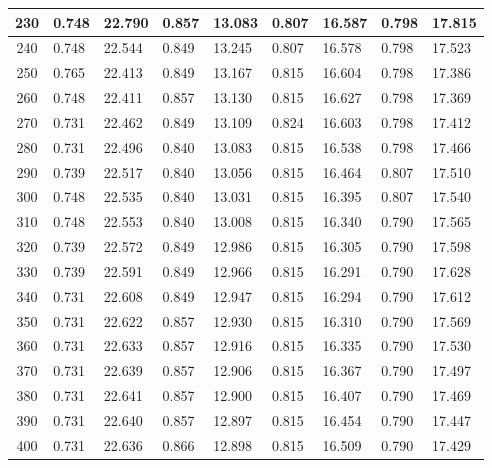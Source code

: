 \documentclass{report}
\begin{document}
\begin{minipage}{\textwidth}
\begin{longtable}{|c|l|l|l|l|l|l|l|l|}
                     230 & 0.748 & 22.790 & 0.857 & 13.083 & 0.807 & 16.587 & 0.798 & 17.815 \\ \hline
                     240 & 0.748 & 22.544 & 0.849 & 13.245 & 0.807 & 16.578 & 0.798 & 17.523 \\ \hline
                     250 & 0.765 & 22.413 & 0.849 & 13.167 & 0.815 & 16.604 & 0.798 & 17.386 \\ \hline
                     260 & 0.748 & 22.411 & 0.857 & 13.130 & 0.815 & 16.627 & 0.798 & 17.369 \\ \hline
                     270 & 0.731 & 22.462 & 0.849 & 13.109 & 0.824 & 16.603 & 0.798 & 17.412 \\ \hline
                     280 & 0.731 & 22.496 & 0.840 & 13.083 & 0.815 & 16.538 & 0.798 & 17.466 \\ \hline
                     290 & 0.739 & 22.517 & 0.840 & 13.056 & 0.815 & 16.464 & 0.807 & 17.510 \\ \hline
                     300 & 0.748 & 22.535 & 0.840 & 13.031 & 0.815 & 16.395 & 0.807 & 17.540 \\ \hline
                     310 & 0.748 & 22.553 & 0.840 & 13.008 & 0.815 & 16.340 & 0.790 & 17.565 \\ \hline
                     320 & 0.739 & 22.572 & 0.849 & 12.986 & 0.815 & 16.305 & 0.790 & 17.598 \\ \hline
                     330 & 0.739 & 22.591 & 0.849 & 12.966 & 0.815 & 16.291 & 0.790 & 17.628 \\ \hline
                     340 & 0.731 & 22.608 & 0.849 & 12.947 & 0.815 & 16.294 & 0.790 & 17.612 \\ \hline
                     350 & 0.731 & 22.622 & 0.857 & 12.930 & 0.815 & 16.310 & 0.790 & 17.569 \\ \hline
                     360 & 0.731 & 22.633 & 0.857 & 12.916 & 0.815 & 16.335 & 0.790 & 17.530 \\ \hline
                     370 & 0.731 & 22.639 & 0.857 & 12.906 & 0.815 & 16.367 & 0.790 & 17.497 \\ \hline
                     380 & 0.731 & 22.641 & 0.857 & 12.900 & 0.815 & 16.407 & 0.790 & 17.469 \\ \hline
                     390 & 0.731 & 22.640 & 0.857 & 12.897 & 0.815 & 16.454 & 0.790 & 17.447 \\ \hline
                     400 & 0.731 & 22.636 & 0.866 & 12.898 & 0.815 & 16.509 & 0.790 & 17.429 \\ \hline
                 \end{longtable}
    \end{minipage}
\end{document}

